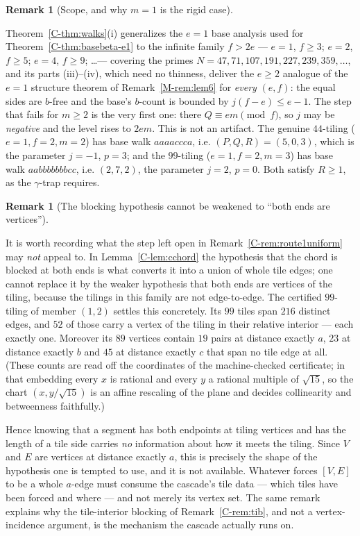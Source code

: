 \documentclass[11pt,reqno]{amsart}
\theoremstyle{plain}
\theoremstyle{definition}
\newtheorem{remark}[theorem]{Remark}
\begin{document}
\begin{remark}[Scope, and why $m=1$ is the rigid case]\label{O-walkscope}

Theorem~\ref{C-thm:walks}(i) generalizes the $e=1$ base analysis used for
Theorem~\ref{C-thm:basebeta-e1} to the infinite family $f>2e$ --- $e=1$, $f\ge3$; $e=2$, $f\ge5$;
$e=4$, $f\ge9$; \dots --- covering the primes $N=47,71,107,191,227,239,359,\dots$, and its parts (iii)--(iv),
which need no thinness, deliver the $e\ge2$ analogue of the $e=1$ structure theorem of
Remark~\ref{M-rem:lem6} for \emph{every} $(e,f)$: the equal sides are $b$-free and the base's $b$-count
is bounded by $j(f-e)\le e-1$. The step that fails for $m\ge2$ is the very first one: there
$Q\equiv em\pmod f$, so $j$ may be \emph{negative} and the level rises to $2em$. This is not an
artifact. The genuine $44$-tiling ($e{=}1,f{=}2,m{=}2$) has base walk $aaaaccca$, i.e.
$(P,Q,R)=(5,0,3)$, which is the parameter $j=-1$, $p=3$; and the $99$-tiling
($e{=}1,f{=}2,m{=}3$) has base walk $aabbbbbbbcc$, i.e. $(2,7,2)$, the parameter $j=2$, $p=0$. Both
satisfy $R\ge1$, as the $\gamma$-trap requires.
\end{remark}

\begin{remark}[The blocking hypothesis cannot be weakened to ``both ends are vertices'']\label{O-noedgetoedge}

It is worth recording what the step left open in Remark~\ref{C-rem:route1uniform} may \emph{not} appeal
to. In Lemma~\ref{C-lem:cchord} the hypothesis that the chord is blocked at both ends is what converts
it into a union of whole tile edges; one cannot replace it by the weaker hypothesis that both ends
are vertices of the tiling, because the tilings in this family are not edge-to-edge. The certified
$99$-tiling of member $(1,2)$ settles this concretely. Its $99$ tiles span $216$ distinct edges, and
$52$ of those carry a vertex of the tiling in their relative interior --- each exactly one. Moreover
its $89$ vertices contain $19$ pairs at distance exactly $a$, $23$ at distance exactly $b$ and $45$
at distance exactly $c$ that span no tile edge at all. (These counts are read off the coordinates of
the machine-checked certificate; in that embedding every $x$ is rational and every $y$ a rational
multiple of $\sqrt{15}$, so the chart $(x,y/\sqrt{15})$ is an affine rescaling of the plane and
decides collinearity and betweenness faithfully.)

Hence knowing that a segment has both endpoints at tiling vertices and has the length of a tile side
carries \emph{no} information about how it meets the tiling. Since $V$ and $E$ are vertices at
distance exactly $a$, this is precisely the shape of the hypothesis one is tempted to use, and it is
not available. Whatever forces $[V,E]$ to be a whole $a$-edge must consume the cascade's tile data
--- which tiles have been forced and where --- and not merely its vertex set. The same remark
explains why the tile-interior blocking of Remark~\ref{C-rem:tib}, and not a vertex-incidence
argument, is the mechanism the cascade actually runs on.
\end{remark}
\end{document}
